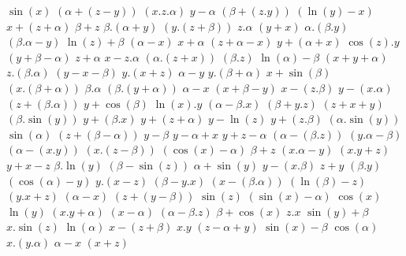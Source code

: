 $ \sin(x) $
$ (\alpha + (z - y)) $
$ (x . z . \alpha) $
$ y - \alpha $
$ (\beta + (z . y)) $
$ (\ln(y) - x) $
$ x + (z + \alpha) $
$ \beta + z $
$ \beta . (\alpha + y) $
$ (y . (z + \beta)) $
$ z . \alpha $
$ (y + x) $
$ \alpha . (\beta . y) $
$ (\beta . \alpha - y) $
$ \ln(z) + \beta $
$ (\alpha - x) $
$ x + \alpha $
$ (z + \alpha - x) $
$ y + (\alpha + x) $
$ \cos(z) . y $
$ (y + \beta - \alpha) $
$ z + \alpha $
$ x - z . \alpha $
$ (\alpha . (z + x)) $
$ (\beta . z) $
$ \ln(\alpha) - \beta $
$ (x + y + \alpha) $
$ z . (\beta . \alpha) $
$ (y - x - \beta) $
$ y . (x + z) $
$ \alpha - y $
$ y . (\beta + \alpha) $
$ x + \sin(\beta) $
$ (x . (\beta + \alpha)) $
$ \beta . \alpha $
$ (\beta . (y + \alpha)) $
$ \alpha - x $
$ (x + \beta - y) $
$ x - (z . \beta) $
$ y - (x . \alpha) $
$ (z + (\beta . \alpha)) $
$ y + \cos(\beta) $
$ \ln(x) . y $
$ (\alpha - \beta . x) $
$ (\beta + y . z) $
$ (z + x + y) $
$ (\beta . \sin(y)) $
$ y + (\beta . x) $
$ y + (z + \alpha) $
$ y - \ln(z) $
$ y + (z . \beta) $
$ (\alpha . \sin(y)) $
$ \sin(\alpha) $
$ (z + (\beta - \alpha)) $
$ y - \beta $
$ y - \alpha + x $
$ y + z - \alpha $
$ (\alpha - (\beta . z)) $
$ (y . \alpha - \beta) $
$ (\alpha - (x . y)) $
$ (x . (z - \beta)) $
$ (\cos(x) - \alpha) $
$ \beta + z $
$ (x . \alpha - y) $
$ (x . y + z) $
$ y + x - z $
$ \beta . \ln(y) $
$ (\beta - \sin(z)) $
$ \alpha + \sin(y) $
$ y - (x . \beta) $
$ z + y $
$ (\beta . y) $
$ (\cos(\alpha) - y) $
$ y . (x - z) $
$ (\beta - y . x) $
$ (x - (\beta . \alpha)) $
$ (\ln(\beta) - z) $
$ (y . x + z) $
$ (\alpha - x) $
$ (z + (y - \beta)) $
$ \sin(z) $
$ (\sin(x) - \alpha) $
$ \cos(x) $
$ \ln(y) $
$ (x . y + \alpha) $
$ (x - \alpha) $
$ (\alpha - \beta . z) $
$ \beta + \cos(x) $
$ z . x $
$ \sin(y) + \beta $
$ x . \sin(z) $
$ \ln(\alpha) $
$ x - (z + \beta) $
$ x . y $
$ (z - \alpha + y) $
$ \sin(x) - \beta $
$ \cos(\alpha) $
$ x . (y . \alpha) $
$ \alpha - x $
$ (x + z) $
